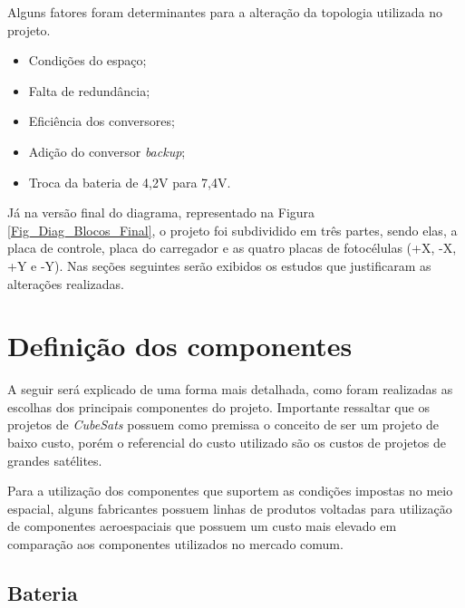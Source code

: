 \documentclass[
	12pt,				%
	openright,			%
	oneside,			%
	a4paper,			%
	english,			%
	french,				%
	spanish,			%
	brazil,				%
	oldfontcommands
	]{abntex2}
\begin{document}
	Alguns fatores foram determinantes para a alteração da topologia utilizada no projeto.
	
	\begin{minipage}{7cm}	
		\begin{itemize}
			\item	Condições do espaço;
			\item	Falta de redundância;
			\item	Eficiência dos conversores;
		\end{itemize}
	\end{minipage}
	\begin{minipage}{7cm}
		\begin{itemize}
			\item	Adição do conversor \textit{backup};
			\item	Troca da bateria de 4,2V para 7,4V.
		\end{itemize}
	\end{minipage}
	\pagebreak
	
	Já na versão final do diagrama, representado na Figura \ref{Fig_Diag_Blocos_Final}, o projeto foi subdividido em três partes, sendo elas, a placa de controle, placa do carregador e as quatro placas de fotocélulas (+X, -X, +Y e -Y). Nas seções seguintes serão exibidos os estudos que justificaram as alterações realizadas.
 
\section[Definição dos componentes]{Definição dos componentes}\label{Sec_Def_Comp}

	A seguir será explicado de uma forma mais detalhada, como foram realizadas as escolhas dos principais componentes do projeto. Importante ressaltar que os projetos de \textit{CubeSats} possuem como premissa o conceito de ser um projeto de baixo custo, porém o referencial do custo utilizado são os custos de projetos de grandes satélites.
	
	Para a utilização dos componentes que suportem as condições impostas  no meio espacial, alguns fabricantes possuem linhas de produtos voltadas para utilização de componentes aeroespaciais que possuem um custo mais elevado em comparação aos componentes utilizados no mercado comum.

\subsection[Bateria]{Bateria} \label{Sec_Bateria}
\end{document}
